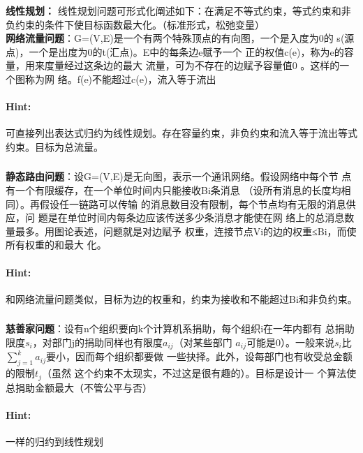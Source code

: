 \documentclass{article}
\begin{document}
     
     \subsubsection{}\textbf{线性规划：}
     线性规划问题可形式化阐述如下：在满足不等式约束，等式约束和非负约束的条件下使目标函数最大化。（标准形式，松弛变量）\\
     \textbf{网络流量问题}：G=(V,E)是一个有两个特殊顶点的有向图，一个是入度为0的
s(源点)，一个是出度为0的t(汇点)。E中的每条边e赋予一个
正的权值c(e)，称为e的容量，用来度量经过这条边的最大
流量，可为不存在的边赋予容量值0 。这样的一个图称为网
络。f(e)不能超过c(e)，流入等于流出\\
     \paragraph{Hint:}可直接列出表达式归约为线性规划。存在容量约束，非负约束和流入等于流出等式约束。目标为总流量。

     \subsubsection{}\textbf{静态路由问题}：设G=(V,E)是无向图，表示一个通讯网络。假设网络中每个节
点有一个有限缓存，在一个单位时间内只能接收Bi条消息
（设所有消息的长度均相同）。再假设任一链路可以传输
的消息数目没有限制，每个节点均有无限的消息供应，问
题是在单位时间内每条边应该传送多少条消息才能使在网
络上的总消息数量最多。用图论表述，问题就是对边赋予
权重，连接节点Vi的边的权重≤Bi，而使所有权重的和最大
化。
     \paragraph{Hint:}和网络流量问题类似，目标为边的权重和，约束为接收和不能超过Bi和非负约束。
     
     
     \subsubsection{}\textbf{慈善家问题}：设有n个组织要向k个计算机系捐助，每个组织i在一年内都有
总捐助限度$s_i$，对部门j的捐助同样也有限度$a_{ij}$（对某些部门
$a_{ij}$可能是0）。一般来说$s_i$比$ \sum ^{k}_{j=1}a_{ij}$要小，因而每个组织都要做
一些抉择。此外，设每部门也有收受总金额的限制$t_
j$（虽然
这个约束不太现实，不过这是很有趣的）。目标是设计一
个算法使总捐助金额最大（不管公平与否）

     \paragraph{Hint:}一样的归约到线性规划
         
\end{document}
